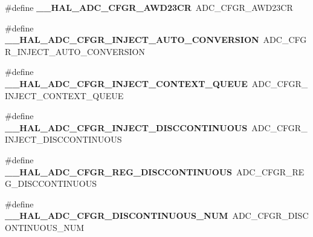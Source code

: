 \begin{DoxyCompactItemize}
\item 
\mbox{\label{group___h_a_l___a_d_c___aliased___macros_ga73200fff4fe5aa62989ea33522fa3cfc}} 
\#define {\bfseries \+\_\+\+\_\+\+H\+A\+L\+\_\+\+A\+D\+C\+\_\+\+C\+F\+G\+R\+\_\+\+A\+W\+D23\+CR}~A\+D\+C\+\_\+\+C\+F\+G\+R\+\_\+\+A\+W\+D23\+CR
\item 
\mbox{\label{group___h_a_l___a_d_c___aliased___macros_ga16b4ff7c58c0fe8141bd8bf6adf0f27c}} 
\#define {\bfseries \+\_\+\+\_\+\+H\+A\+L\+\_\+\+A\+D\+C\+\_\+\+C\+F\+G\+R\+\_\+\+I\+N\+J\+E\+C\+T\+\_\+\+A\+U\+T\+O\+\_\+\+C\+O\+N\+V\+E\+R\+S\+I\+ON}~A\+D\+C\+\_\+\+C\+F\+G\+R\+\_\+\+I\+N\+J\+E\+C\+T\+\_\+\+A\+U\+T\+O\+\_\+\+C\+O\+N\+V\+E\+R\+S\+I\+ON
\item 
\mbox{\label{group___h_a_l___a_d_c___aliased___macros_ga5010d7820f890534d6b6005438038ef5}} 
\#define {\bfseries \+\_\+\+\_\+\+H\+A\+L\+\_\+\+A\+D\+C\+\_\+\+C\+F\+G\+R\+\_\+\+I\+N\+J\+E\+C\+T\+\_\+\+C\+O\+N\+T\+E\+X\+T\+\_\+\+Q\+U\+E\+UE}~A\+D\+C\+\_\+\+C\+F\+G\+R\+\_\+\+I\+N\+J\+E\+C\+T\+\_\+\+C\+O\+N\+T\+E\+X\+T\+\_\+\+Q\+U\+E\+UE
\item 
\mbox{\label{group___h_a_l___a_d_c___aliased___macros_gaeaa692ac73b859de118c28bc0327cf77}} 
\#define {\bfseries \+\_\+\+\_\+\+H\+A\+L\+\_\+\+A\+D\+C\+\_\+\+C\+F\+G\+R\+\_\+\+I\+N\+J\+E\+C\+T\+\_\+\+D\+I\+S\+C\+C\+O\+N\+T\+I\+N\+U\+O\+US}~A\+D\+C\+\_\+\+C\+F\+G\+R\+\_\+\+I\+N\+J\+E\+C\+T\+\_\+\+D\+I\+S\+C\+C\+O\+N\+T\+I\+N\+U\+O\+US
\item 
\mbox{\label{group___h_a_l___a_d_c___aliased___macros_gad118cacc67e8c3f930008f5aa6d8dade}} 
\#define {\bfseries \+\_\+\+\_\+\+H\+A\+L\+\_\+\+A\+D\+C\+\_\+\+C\+F\+G\+R\+\_\+\+R\+E\+G\+\_\+\+D\+I\+S\+C\+C\+O\+N\+T\+I\+N\+U\+O\+US}~A\+D\+C\+\_\+\+C\+F\+G\+R\+\_\+\+R\+E\+G\+\_\+\+D\+I\+S\+C\+C\+O\+N\+T\+I\+N\+U\+O\+US
\item 
\mbox{\label{group___h_a_l___a_d_c___aliased___macros_ga6c152cf129addeff1a7f296fa89b04af}} 
\#define {\bfseries \+\_\+\+\_\+\+H\+A\+L\+\_\+\+A\+D\+C\+\_\+\+C\+F\+G\+R\+\_\+\+D\+I\+S\+C\+O\+N\+T\+I\+N\+U\+O\+U\+S\+\_\+\+N\+UM}~A\+D\+C\+\_\+\+C\+F\+G\+R\+\_\+\+D\+I\+S\+C\+O\+N\+T\+I\+N\+U\+O\+U\+S\+\_\+\+N\+UM

\end{DoxyCompactItemize}
